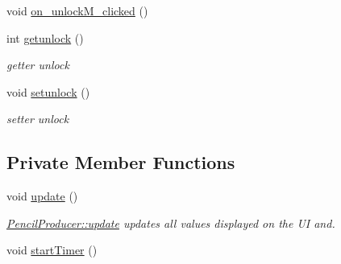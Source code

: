 \begin{DoxyCompactItemize}
\item 
void \mbox{\hyperlink{classPencilProducer_a64ee24e1bfd7b94f69fd997b15c6ffb0}{on\+\_\+unlock\+M\+\_\+clicked}} ()
\item 
int \mbox{\hyperlink{classPencilProducer_a86c70087a11297efafa1326d86da8db8}{getunlock}} ()
\begin{DoxyCompactList}\small\item\em getter unlock \end{DoxyCompactList}\item 
void \mbox{\hyperlink{classPencilProducer_afc339bfc62d0585de028e577b38cb8a3}{setunlock}} ()
\begin{DoxyCompactList}\small\item\em setter unlock \end{DoxyCompactList}\end{DoxyCompactItemize}
\subsection*{Private Member Functions}
\begin{DoxyCompactItemize}
\item 
void \mbox{\hyperlink{classPencilProducer_afcd36c151c55ad1c9024873050eaee4d}{update}} ()
\begin{DoxyCompactList}\small\item\em \mbox{\hyperlink{classPencilProducer_afcd36c151c55ad1c9024873050eaee4d}{Pencil\+Producer\+::update}} updates all values displayed on the UI and. \end{DoxyCompactList}\item 
void \mbox{\hyperlink{classPencilProducer_ae4a56a7023ae3bb0b3f781c3f2a99d7e}{start\+Timer}} ()
\end{DoxyCompactItemize}
